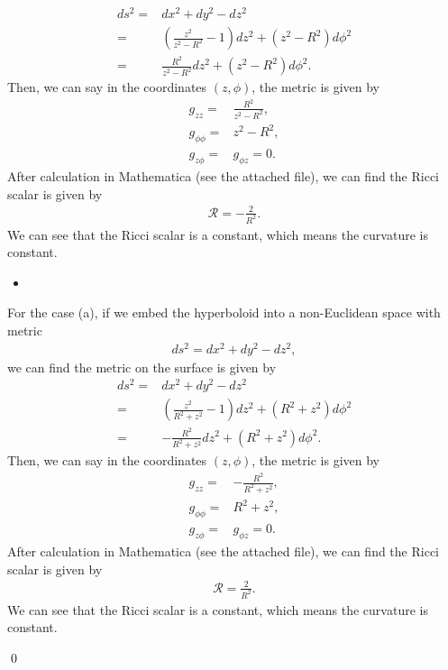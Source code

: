 \begin{align}
    ds^2=&dx^2+dy^2-dz^2\\
    =&\left(\frac{z^2}{z^2-R^2}-1\right)dz^2+(z^2-R^2)d\phi^2\\
    =&\frac{R^2}{z^2-R^2}dz^2+(z^2-R^2)d\phi^2.
\end{align}
Then, we can say in the coordinates $(z, \phi)$, the metric is given by
\begin{align}
    g_{zz}=&\frac{R^2}{z^2-R^2},\\
    g_{\phi\phi}=&z^2-R^2,\\
    g_{z\phi}=&g_{\phi z}=0.
\end{align}
After calculation in Mathematica (see the attached file), we can find the Ricci scalar is given by
\begin{align}
    \mathcal{R}=-\frac{2}{R^2}.
\end{align}
We can see that the Ricci scalar is a constant, which means the curvature is constant. 

\begin{itemize}
    \item [(a)]
\end{itemize}
For the case (a), if we embed the hyperboloid into a non-Euclidean space with metric
\begin{align}
    ds^2=dx^2+dy^2-dz^2,
\end{align}we can find the metric on the surface is given by
\begin{align}
    ds^2=&dx^2+dy^2-dz^2\\
    =&\left(\frac{z^2}{R^2+z^2}-1\right)dz^2+(R^2+z^2)d\phi^2\\
    =&-\frac{R^2}{R^2+z^2}dz^2+(R^2+z^2)d\phi^2.
\end{align}
Then, we can say in the coordinates $(z, \phi)$, the metric is given by
\begin{align}
    g_{zz}=&-\frac{R^2}{R^2+z^2},\\
    g_{\phi\phi}=&R^2+z^2,\\
    g_{z\phi}=&g_{\phi z}=0.
\end{align}
After calculation in Mathematica (see the attached file), we can find the Ricci scalar is given by
\begin{align}
    \mathcal{R}=\frac{2}{R^2}.
\end{align}
We can see that the Ricci scalar is a constant, which means the curvature is constant. 

\qed




